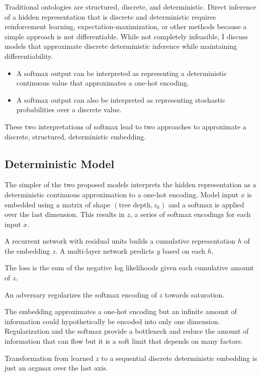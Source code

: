 \documentclass[sigconf]{acmart}
\begin{document}
Traditional ontologies are structured, discrete, and deterministic. Direct inference of a hidden representation that is discrete and deterministic requires reinforcement learning, expectation-maximization, or other methods because a simple approach is not differentiable. While not completely infeasible, I discuss models that approximate discrete deterministic inference while maintaining differentiability.

\begin{itemize}
\item A softmax output can be interpreted as representing a deterministic continuous value that approximates a one-hot encoding.
\item A softmax output can also be interpreted as representing stochastic probabilities over a discrete value.
\end{itemize}

These two interpretations of softmax lead to two approaches to approximate a discrete, structured, deterministic embedding.

\subsection{Deterministic Model}

The simpler of the two proposed models interprets the hidden representation as a deterministic continuous approximation to a one-hot encoding. Model input $x$ is embedded using a matrix of shape $(\text{tree depth}, z_k)$ and a softmax is applied over the last dimension. This results in $z$, a series of softmax encodings for each input $x$.

A recurrent network with residual units builds a cumulative representation $h$ of the embedding $z$. A multi-layer network predicts $y$ based on each $h$.

The loss is the sum of the negative log likelihoods given each cumulative amount of $z$.

An adversary regularizes the softmax encoding of $z$ towards saturation.

The embedding approximates a one-hot encoding but an infinite amount of information could hypothetically be encoded into only one dimension. Regularization and the softmax provide a bottleneck and reduce the amount of information that can flow but it is a soft limit that depends on many factors.

Transformation from learned $z$ to a sequential discrete deterministic embedding is just an argmax over the last axis.
\end{document}
